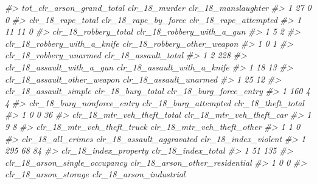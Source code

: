 \documentclass[
]{krantz}
\makeatletter
\newenvironment{Shaded}{\begin{snugshade}}{\end{snugshade}}
\newcommand{\CommentTok}[1]{\textcolor[rgb]{0.37,0.37,0.37}{\textit{#1}}}
\newenvironment{kframe}{%
\medskip{}
\setlength{\fboxsep}{.8em}
 \def\at@end@of@kframe{}%
 \ifinner\ifhmode%
  \def\at@end@of@kframe{\end{minipage}}%
  \begin{minipage}{\columnwidth}%
 \fi\fi%
 \def\FrameCommand##1{\hskip\@totalleftmargin \hskip-\fboxsep
 \colorbox{shadecolor}{##1}\hskip-\fboxsep
     \hskip-\linewidth \hskip-\@totalleftmargin \hskip\columnwidth}%
 \MakeFramed {\advance\hsize-\width
   \@totalleftmargin\z@ \linewidth\hsize
   \@setminipage}}%
 {\par\unskip\endMakeFramed%
 \at@end@of@kframe}
\renewenvironment{Shaded}{\begin{kframe}}{\end{kframe}}
\makeatother
\begin{document}
\begin{Shaded}
\begin{Highlighting}[]
\CommentTok{\#\textgreater{}   tot\_clr\_arson\_grand\_total clr\_18\_murder clr\_18\_manslaughter}
\CommentTok{\#\textgreater{} 1                        27             0                   0}
\CommentTok{\#\textgreater{}   clr\_18\_rape\_total clr\_18\_rape\_by\_force clr\_18\_rape\_attempted}
\CommentTok{\#\textgreater{} 1                11                   11                     0}
\CommentTok{\#\textgreater{}   clr\_18\_robbery\_total clr\_18\_robbery\_with\_a\_gun}
\CommentTok{\#\textgreater{} 1                    5                         2}
\CommentTok{\#\textgreater{}   clr\_18\_robbery\_with\_a\_knife clr\_18\_robbery\_other\_weapon}
\CommentTok{\#\textgreater{} 1                           0                           1}
\CommentTok{\#\textgreater{}   clr\_18\_robbery\_unarmed clr\_18\_assault\_total}
\CommentTok{\#\textgreater{} 1                      2                  228}
\CommentTok{\#\textgreater{}   clr\_18\_assault\_with\_a\_gun clr\_18\_assault\_with\_a\_knife}
\CommentTok{\#\textgreater{} 1                        18                          13}
\CommentTok{\#\textgreater{}   clr\_18\_assault\_other\_weapon clr\_18\_assault\_unarmed}
\CommentTok{\#\textgreater{} 1                          25                     12}
\CommentTok{\#\textgreater{}   clr\_18\_assault\_simple clr\_18\_burg\_total clr\_18\_burg\_force\_entry}
\CommentTok{\#\textgreater{} 1                   160                 4                       4}
\CommentTok{\#\textgreater{}   clr\_18\_burg\_nonforce\_entry clr\_18\_burg\_attempted clr\_18\_theft\_total}
\CommentTok{\#\textgreater{} 1                          0                     0                 36}
\CommentTok{\#\textgreater{}   clr\_18\_mtr\_veh\_theft\_total clr\_18\_mtr\_veh\_theft\_car}
\CommentTok{\#\textgreater{} 1                          9                        8}
\CommentTok{\#\textgreater{}   clr\_18\_mtr\_veh\_theft\_truck clr\_18\_mtr\_veh\_theft\_other}
\CommentTok{\#\textgreater{} 1                          1                          0}
\CommentTok{\#\textgreater{}   clr\_18\_all\_crimes clr\_18\_assault\_aggravated clr\_18\_index\_violent}
\CommentTok{\#\textgreater{} 1               295                        68                   84}
\CommentTok{\#\textgreater{}   clr\_18\_index\_property clr\_18\_index\_total}
\CommentTok{\#\textgreater{} 1                    51                135}
\CommentTok{\#\textgreater{}   clr\_18\_arson\_single\_occupancy clr\_18\_arson\_other\_residential}
\CommentTok{\#\textgreater{} 1                             0                              0}
\CommentTok{\#\textgreater{}   clr\_18\_arson\_storage clr\_18\_arson\_industrial}

\end{Highlighting}
\end{Shaded}
\end{document}
